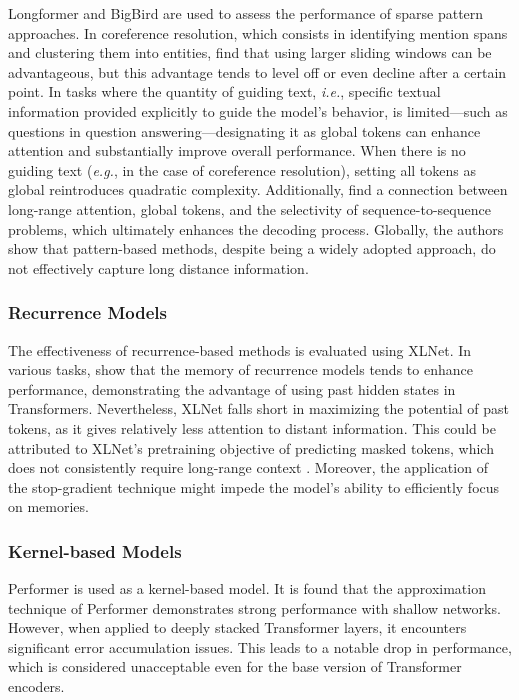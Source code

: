 Longformer and BigBird are used to assess the performance of sparse pattern approaches. In coreference resolution, which consists in identifying mention spans and clustering them into entities, \citet{qin2022nlp} find that using larger sliding windows can be advantageous, but this advantage tends to level off or even decline after a certain point. In tasks where the quantity of guiding text, \textit{i.e.}, specific textual information provided explicitly to guide the model's behavior, is limited—such as questions in question answering—designating it as global tokens can enhance attention and substantially improve overall performance. When there is no guiding text (\textit{e.g.}, in the case of coreference resolution), setting all tokens as global reintroduces quadratic complexity. Additionally, \citet{qin2022nlp} find a connection between long-range attention, global tokens, and the selectivity of sequence-to-sequence problems, which ultimately enhances the decoding process. Globally, the authors show that pattern-based methods, despite being a widely adopted approach, do not effectively capture long distance information.

\subsubsection{Recurrence Models} 

The effectiveness of recurrence-based methods is evaluated using XLNet. In various tasks, \citet{qin2022nlp} show that the memory of recurrence models tends to enhance performance, demonstrating the advantage of using past hidden states in Transformers. Nevertheless, XLNet falls short in maximizing the potential of past tokens, as it gives relatively less attention to distant information. This could be attributed to XLNet's pretraining objective of predicting masked tokens, which does not consistently require long-range context \citep{sun2021long}. Moreover, the application of the stop-gradient technique might impede the model's ability to efficiently focus on memories.

\subsubsection{Kernel-based Models} 

Performer is used as a kernel-based model. It is found that the approximation technique of Performer demonstrates strong performance with shallow networks. However, when applied to deeply stacked Transformer layers, it encounters significant  error accumulation issues. This leads to a notable drop in performance, which is considered unacceptable even for the base version of Transformer encoders. 


